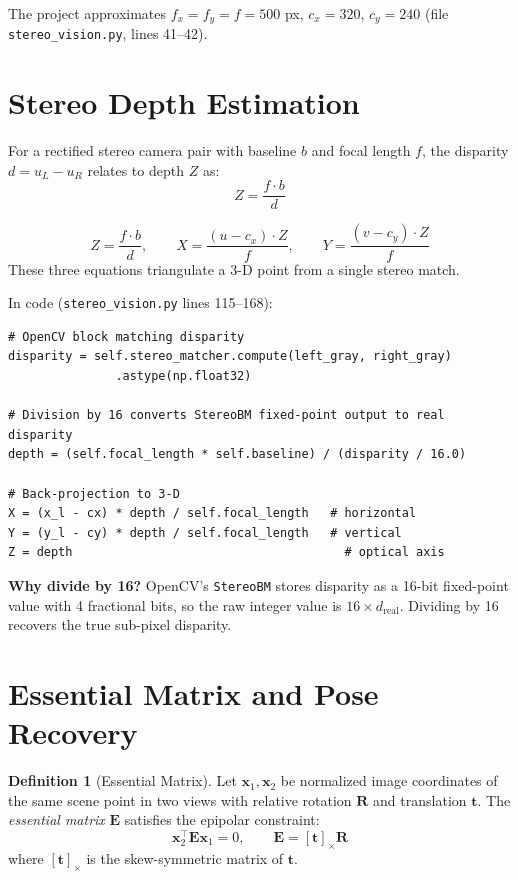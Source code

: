 \documentclass[12pt,a4paper,twoside]{report}
\theoremstyle{definition}
\newtheorem{definition}{Definition}[chapter]
\newcommand{\vect}[1]{\bm{#1}}
\newcommand{\mat}[1]{\mathbf{#1}}
\newcommand{\T}{\top}           %
\newcommand{\code}[1]{\texttt{#1}}
\newcommand{\file}[1]{\texttt{\textcolor{codeblue}{#1}}}
\begin{document}
\noindent The project approximates $f_x=f_y=f=500$ px, $c_x=320$, $c_y=240$
(file \file{stereo\_vision.py}, lines 41--42).

\section{Stereo Depth Estimation}

For a rectified stereo camera pair with baseline $b$ and focal length $f$,
the disparity $d = u_L - u_R$ relates to depth $Z$ as:
\[
  Z = \frac{f \cdot b}{d}
\]

\begin{mathbox}
\[
  Z = \frac{f \cdot b}{d}, \qquad X = \frac{(u-c_x)\cdot Z}{f}, \qquad Y = \frac{(v-c_y)\cdot Z}{f}
\]
These three equations triangulate a 3-D point from a single stereo match.
\end{mathbox}

\noindent In code (\file{stereo\_vision.py} lines 115--168):
\begin{lstlisting}
# OpenCV block matching disparity
disparity = self.stereo_matcher.compute(left_gray, right_gray)
               .astype(np.float32)

# Division by 16 converts StereoBM fixed-point output to real disparity
depth = (self.focal_length * self.baseline) / (disparity / 16.0)

# Back-projection to 3-D
X = (x_l - cx) * depth / self.focal_length   # horizontal
Y = (y_l - cy) * depth / self.focal_length   # vertical
Z = depth                                      # optical axis
\end{lstlisting}

\noindent \textbf{Why divide by 16?} OpenCV's \code{StereoBM} stores disparity as
a 16-bit fixed-point value with 4 fractional bits, so the raw integer value is
$16\times d_{\text{real}}$.  Dividing by 16 recovers the true sub-pixel disparity.

\section{Essential Matrix and Pose Recovery}

\begin{definition}[Essential Matrix]
Let $\vect{x}_1, \vect{x}_2$ be normalized image coordinates of the same scene
point in two views with relative rotation $\mat{R}$ and translation $\vect{t}$.
The \emph{essential matrix} $\mat{E}$ satisfies the epipolar constraint:
\[
  \vect{x}_2^\T \mat{E} \vect{x}_1 = 0, \qquad \mat{E} = [\vect{t}]_\times \mat{R}
\]
where $[\vect{t}]_\times$ is the skew-symmetric matrix of $\vect{t}$.
\end{definition}
\end{document}
